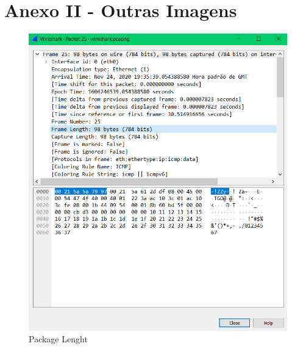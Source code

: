 \documentclass[article, a4paper, 11pt, oneside]{memoir}
\begin{document}
\newpage
\section{Anexo II - Outras Imagens}
\begin{figure}[h]
	\centering
\includegraphics[scale=0.30]{package-length.png}
\caption{Package Lenght}
\end{figure}
\end{document}
